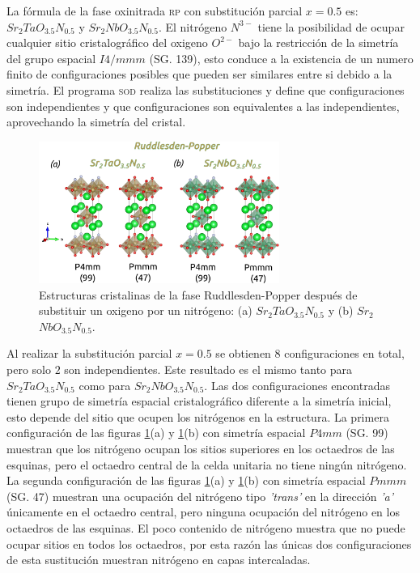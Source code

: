 La fórmula de la fase oxinitrada \textsc{rp} con substitución parcial $x=0.5$ es: $Sr_{2}TaO_{3.5}N_{0.5}$ y  $Sr_{2}NbO_{3.5}N_{0.5}$. El nitrógeno $N^{3-}$ tiene la posibilidad de ocupar cualquier sitio cristalográfico del oxigeno $O^{2-}$ bajo la restricción de la simetría del grupo espacial $I4/mmm$ (SG. 139), esto conduce a la existencia de un numero finito de configuraciones posibles que pueden ser similares entre si debido a la simetría. El programa \textsc{sod} realiza las substituciones y define que configuraciones son independientes y que configuraciones son equivalentes a las independientes, aprovechando la simetría del cristal\cite{Grau-Crespo2007}.

\begin{figure}[H]
    \centering
    \includegraphics[width=0.7\textwidth]{Figs/rp_05.png}
    \caption{Estructuras cristalinas de la fase Ruddlesden-Popper después de substituir un oxigeno por un nitrógeno: (a) \textcolor{Sr}{$Sr_{2}$}\textcolor{Ta}{$Ta$}\textcolor{O}{$O_{3.5}$}\textcolor{N}{$N_{0.5}$} y (b) \textcolor{Sr}{$Sr_{2}$}\textcolor{Nb}{$Nb$}\textcolor{O}{$O_{3.5}$}\textcolor{N}{$N_{0.5}$}.}
    \label{Fig. rp_05}
\end{figure}

Al realizar la substitución parcial $x=0.5$ se obtienen $8$ configuraciones en total, pero solo $2$ son independientes. Este resultado es el mismo tanto para $Sr_{2}TaO_{3.5}N_{0.5}$ como para  $Sr_{2}NbO_{3.5}N_{0.5}$. Las dos configuraciones encontradas tienen grupo de simetría espacial cristalográfico diferente a la simetría inicial, esto depende del sitio que ocupen los nitrógenos en la estructura. La primera configuración de las figuras \ref{Fig. rp_05}(a) y \ref{Fig. rp_05}(b) con simetría espacial $P4mm$ (SG. 99) muestran que los nitrógeno ocupan los sitios superiores en los octaedros de las esquinas, pero el octaedro central de la celda unitaria no tiene ningún nitrógeno. 
La segunda configuración de las figuras \ref{Fig. rp_05}(a) y \ref{Fig. rp_05}(b) con simetría espacial $Pmmm$ (SG. 47) muestran una ocupación del nitrógeno tipo \emph{'trans'} en la dirección \emph{'a'} únicamente en el octaedro central, pero ninguna ocupación del nitrógeno en los octaedros de las esquinas. El poco contenido de nitrógeno muestra que no puede ocupar sitios en todos los octaedros, por esta razón las únicas dos configuraciones de esta sustitución muestran nitrógeno en capas intercaladas.

